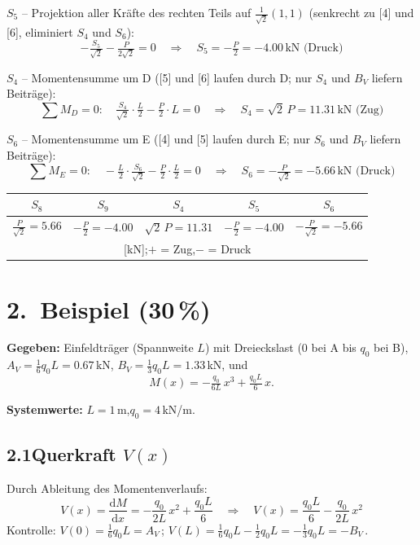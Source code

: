 \documentclass[a4paper,11pt]{article}
\begin{document}
\textbf{$S_5$} -- Projektion aller Kräfte des rechten Teils auf $\tfrac{1}{\sqrt{2}}(1,1)$
(senkrecht zu [4] und [6], eliminiert $S_4$ und $S_6$):
\[
  -\tfrac{S_5}{\sqrt{2}} - \tfrac{P}{2\sqrt{2}} = 0
  \quad\Rightarrow\quad \boxed{S_5 = -\tfrac{P}{2} = -4.00\,\text{kN (Druck)}}
\]

\textbf{$S_4$} -- Momentensumme um D
([5] und [6] laufen durch D; nur $S_4$ und $B_V$ liefern Beiträge):
\[
  \sum M_D = 0:\quad \tfrac{S_4}{\sqrt{2}}\cdot\tfrac{L}{2} - \tfrac{P}{2}\cdot L = 0
  \quad\Rightarrow\quad \boxed{S_4 = \sqrt{2}\,P = 11.31\,\text{kN (Zug)}}
\]

\textbf{$S_6$} -- Momentensumme um E
([4] und [5] laufen durch E; nur $S_6$ und $B_V$ liefern Beiträge):
\[
  \sum M_E = 0:\quad -\tfrac{L}{2}\cdot\tfrac{S_6}{\sqrt{2}} - \tfrac{P}{2}\cdot\tfrac{L}{2} = 0
  \quad\Rightarrow\quad \boxed{S_6 = -\tfrac{P}{\sqrt{2}} = -5.66\,\text{kN (Druck)}}
\]

\medskip
\begin{center}
\begin{tabular}{ccccc}
\toprule
$S_8$ & $S_9$ & $S_4$ & $S_5$ & $S_6$ \\
\midrule
$\tfrac{P}{\sqrt{2}} = 5.66$ & $-\tfrac{P}{2} = -4.00$ &
$\sqrt{2}\,P = 11.31$ & $-\tfrac{P}{2} = -4.00$ & $-\tfrac{P}{\sqrt{2}} = -5.66$ \\
\multicolumn{5}{c}{\small [kN];\quad $+$ = Zug,\quad $-$ = Druck} \\
\bottomrule
\end{tabular}
\end{center}

\newpage
\section*{2.~Beispiel \hfill (30\,\%)}

\textbf{Gegeben:} Einfeldträger (Spannweite $L$) mit Dreieckslast
(0 bei A bis $q_0$ bei B),
$A_V = \tfrac{1}{6}q_0 L = 0.67$\,kN,
$B_V = \tfrac{1}{3}q_0 L = 1.33$\,kN, und
\[
  M(x) = -\tfrac{q_0}{6L}\,x^3 + \tfrac{q_0 L}{6}\,x.
\]

\textbf{Systemwerte:} $L = 1$\,m,\quad $q_0 = 4$\,kN/m.

\subsection*{2.1\quad Querkraft $V(x)$}

Durch Ableitung des Momentenverlaufs:
\[
  V(x) = \frac{\mathrm{d}M}{\mathrm{d}x}
        = -\frac{q_0}{2L}\,x^2 + \frac{q_0 L}{6}
  \quad\Rightarrow\quad
  \boxed{V(x) = \frac{q_0 L}{6} - \frac{q_0}{2L}\,x^2}
\]
Kontrolle: $V(0) = \tfrac{1}{6}q_0 L = A_V$\,\checkmark;\quad
$V(L) = \tfrac{1}{6}q_0 L - \tfrac{1}{2}q_0 L = -\tfrac{1}{3}q_0 L = -B_V$\,\checkmark.
\end{document}
